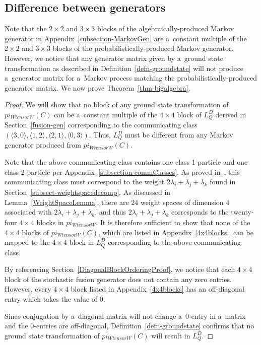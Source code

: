 \documentclass[10pt,a4paper]{amsart}
\numberwithin{equation}{section}
\theoremstyle{definition}
\def\pi{pi}
\def\otimes{ tensor }
\begin{document}
\subsection{Difference between generators}
Note that the $2 \times 2$ and $3 \times 3$ blocks of the algebraically-produced Markov generator in Appendix~\ref{subsection-MarkovGen} are a~constant multiple of the $2 \times 2$ and $3 \times 3$ blocks of the probabilistically-produced Markov generator. However, we notice that any generator matrix given by a~ground state transformation as described in Definition~\ref{defn-groundstate} will not produce a~generator matrix for a~Markov process matching the probabilistically-produced generator matrix. We now prove Theorem~\ref{thm-bigalgebra}.

\begin{proof}
 We will show that no block of any ground state transformation of $\pi_{W \otimes W}(C)$ can be a~constant multiple of the $4\times 4$ block of $L^D_Q$ derived in Section~\ref{fusion-gen} corresponding to the communicating class $( \langle 3, 0\rangle, \langle1, 2\rangle, \langle2, 1\rangle, \langle0, 3\rangle)$.
 Thus, $L^D_Q$ must be different from any Markov generator produced from $\pi_{W \otimes W}(C)$.

 Note that the above communicating class contains one class 1 particle and one class 2 particle per Appendix~\ref{subsection-commClasses}. As proved in~\cite[Proposition 2.5]{kuan2020interactingparticlesystemstype}, this communicating class must correspond to the weight $2 \lambda_i + \lambda_j +\lambda_k$
 found in Section~\ref{subsect-weightspacedecomp}. As discussed in Lemma~\ref{WeightSpaceLemma}, there are $24$ weight spaces of dimension $4$ associated with $2 \lambda_i + \lambda_j +\lambda_k$, and thus $2 \lambda_i + \lambda_j +\lambda_k$ corresponds to the twenty-four $4 \times 4$ blocks in $\pi_{W \otimes W}$. It is therefore sufficient to show that none of the $4 \times 4$ blocks of $\pi_{W \otimes W}(C)$, which are listed in Appendix~\ref{4x4blocks}, can be mapped to the $4 \times 4$ block in $L^D_Q$ corresponding to the above communicating class.

 By referencing Section~\ref{DiagonalBlockOrderingProof}, we notice that each $4 \times 4$ block of the stochastic fusion generator does not contain any zero entries. However, every $4 \times 4$ block listed in Appendix~\ref{4x4blocks} has an off-diagonal entry which takes the value of $0$.

 Since conjugation by a~diagonal matrix will not change a~$0$-entry in a~matrix and the $0$-entries are off-diagonal, Definition~\ref{defn-groundstate} confirms that no ground state transformation of $\pi_{W \otimes W}(C)$ will result in $L^D_Q$.
\end{proof}
\end{document}
